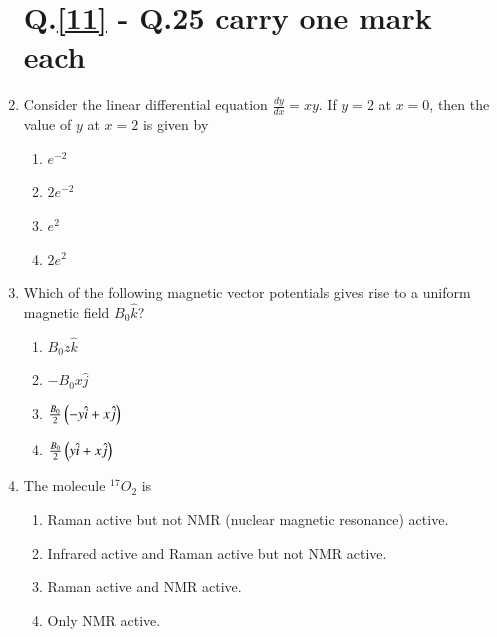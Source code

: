 \documentclass[journal]{IEEEtran}
\begin{document}
\begin{enumerate}
    \section*{Q.\ref{11} - Q.25 carry one mark each}
    \item \label{11} Consider the linear differential equation $\frac{dy}{dx} = xy$. If $y=2$ at $x=0$, then the value of $y$ at $x=2$ is given by
        \begin{enumerate}
            \item $e^{-2}$
            \item $2e^{-2}$
            \item $e^{2}$
            \item $2e^{2}$
        \end{enumerate}

    \item Which of the following magnetic vector potentials gives rise to a uniform magnetic field $B_0 \hat{k}$?
        \begin{enumerate}
            \item $B_0 z \hat{k}$
            \item $- B_0 x \hat{j}$
            \item $\frac{B_0}{2} \left(-y \hat{i} + x \hat{j}\right)$
            \item $\frac{B_0}{2} \left(y \hat{i} + x \hat{j}\right)$
        \end{enumerate}

    \item The molecule $^{17}O_2$ is
        \begin{enumerate}
            \item Raman active but not NMR (nuclear magnetic resonance) active.
            \item Infrared active and Raman active but not NMR active.
            \item Raman active and NMR active.
            \item Only NMR active.
        \end{enumerate}
\end{enumerate}


  
\end{document}
